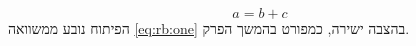 
\makeatletter
\protected{}
\def\maketag@@@#1{\ORIGmaketag@@@{\foreignlanguage{english}{#1}}}
\makeatother

\begin{equation}\label{eq:rb:one} a = b + c \end{equation}
הפיתוח נובע ממשוואה \eqref{eq:rb:one} בהצבה ישירה, כמפורט בהמשך הפרק.

